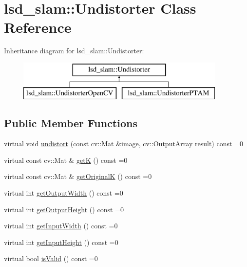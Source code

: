 \hypertarget{classlsd__slam_1_1_undistorter}{\section{lsd\-\_\-slam\-:\-:Undistorter Class Reference}
\label{classlsd__slam_1_1_undistorter}
}
Inheritance diagram for lsd\-\_\-slam\-:\-:Undistorter\-:\begin{figure}[H]
\begin{center}
\leavevmode
\includegraphics[height=2.000000cm]{classlsd__slam_1_1_undistorter}
\end{center}
\end{figure}
\subsection*{Public Member Functions}
\begin{DoxyCompactItemize}
\item 
virtual void \hyperlink{classlsd__slam_1_1_undistorter_a63a7b454de8e39827baf388475a013c0}{undistort} (const cv\-::\-Mat \&image, cv\-::\-Output\-Array result) const =0
\item 
virtual const cv\-::\-Mat \& \hyperlink{classlsd__slam_1_1_undistorter_ad1e2c7f6b622c6c3055fb895ba9956c4}{get\-K} () const =0
\item 
virtual const cv\-::\-Mat \& \hyperlink{classlsd__slam_1_1_undistorter_aa53850c410d84266cc682db6ab37a7a1}{get\-Original\-K} () const =0
\item 
virtual int \hyperlink{classlsd__slam_1_1_undistorter_aefaf2aec48ea920aac875c7da945efec}{get\-Output\-Width} () const =0
\item 
virtual int \hyperlink{classlsd__slam_1_1_undistorter_a72dc7d213c5fd408c586158c30578276}{get\-Output\-Height} () const =0
\item 
virtual int \hyperlink{classlsd__slam_1_1_undistorter_ad809f3b69500eae5f689a60ca766dd2e}{get\-Input\-Width} () const =0
\item 
virtual int \hyperlink{classlsd__slam_1_1_undistorter_a673e446ee77a3bbb3e934e541963612a}{get\-Input\-Height} () const =0
\item 
virtual bool \hyperlink{classlsd__slam_1_1_undistorter_a449d951327590c333da0432e6bac7b14}{is\-Valid} () const =0
\end{DoxyCompactItemize}
